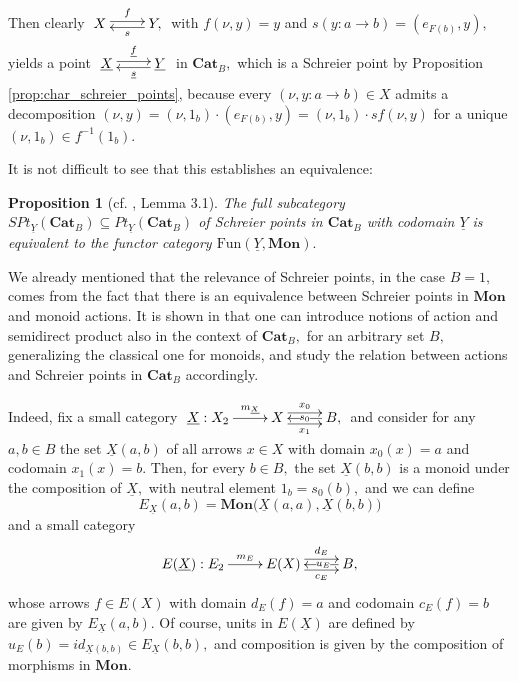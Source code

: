 \documentclass[11pt]{amsart}
\theoremstyle{plain}
\newtheorem{proposition}[subsubsection]{Proposition}
\theoremstyle{definition}
\theoremstyle{remark}
\newcommand{\un}{\underline}
\begin{document}
Then clearly $\xymatrix{X \ar@<.5ex>[r]^-f &{Y,} \ar@<.5ex>[l]^-s }$ with $f(\nu,y)=y$ and $s(y\colon a\rightarrow b)=(e_{F(b)},y),$ yields a point $\xymatrix{{\underline{X}} \ar@<.5ex>[r]^-{\underline{f}} &{\underline{Y}} \ar@<.5ex>[l]^-{\underline{s}} }$ in $\mathbf{Cat}_B,$ which is a Schreier point by Proposition \ref{prop:char_schreier_points}, because every $(\nu,y\colon a\rightarrow b)\in X$ admits a decomposition $(\nu,y)=(\nu,1_b)\cdot(e_{F(b)},y)=(\nu,1_b)\cdot sf(\nu,y)$ for a unique $(\nu,1_b)\in f^{-1}(1_b).$

It is not difficult to see that this establishes an equivalence:
\begin{proposition}[cf. \cite{mal'tsev-reflection}, Lemma 3.1]
\label{prop:schreier_functors}
The full subcategory $SPt_{\underline{Y}}(\mathbf{Cat}_B)\subseteq Pt_{\underline{Y}}(\mathbf{Cat}_B)$ of Schreier points in $\mathbf{Cat}_B$ with codomain $\underline{Y}$ is equivalent to the functor category $\mathrm{Fun}(\underline{Y},\mathbf{Mon}).$
\end{proposition}
We already mentioned that the relevance of Schreier points, in the case $B=1,$ comes from the fact that there is an equivalence between Schreier points in $\mathbf{Mon}$ and monoid actions. It is shown in \cite{a1} that one can introduce notions of action and semidirect product also in the context of $\mathbf{Cat}_B,$ for an arbitrary set $B,$ generalizing the classical one for monoids, and study the relation between actions and Schreier points in $\mathbf{Cat}_B$ accordingly.

Indeed, fix a small category $\xymatrix{{\underline{X}:X_2} \ar[r]^-{m_{\un{X}}} &{X} \ar@<.9ex>[r]^-{x_0} \ar@<-.9ex>[r]_-{x_1} &{B,} \ar[l]|-{s_0}}$ and consider for any $a,b\in B$ the set $\un{X}(a,b)$ of all arrows $x\in X$ with domain $x_0(x)=a$ and codomain $x_1(x)=b.$ Then, for every $b\in B,$ the set $\un{X}(b,b)$ is a monoid under the composition of $\un{X},$ with neutral element $1_b=s_0(b),$ and we can define
\begin{equation*}
E_{\un{X}}(a,b)=\mathbf{Mon}\big(\un{X}(a,a),\un{X}(b,b)\big)
\end{equation*}
and a small category
\begin{equation*}
\xymatrix{E({\underline{X}):E_2} \ar[r]^-{m_E} &{E(X)} \ar@<.9ex>[r]^-{d_E} \ar@<-.9ex>[r]_-{c_E} &{B,} \ar[l]|(.40){u_E}}
\end{equation*}
whose arrows $f\in E(X)$ with domain $d_E(f)=a$ and codomain $c_E(f)=b$ are given by $E_{\un{X}}(a,b).$ Of course, units in $E(\un{X})$ are defined by $u_E(b)=id_{\un{X}(b,b)}\in E_{\un{X}}(b,b),$ and composition is given by the composition of morphisms in $\mathbf{Mon}.$
\end{document}
